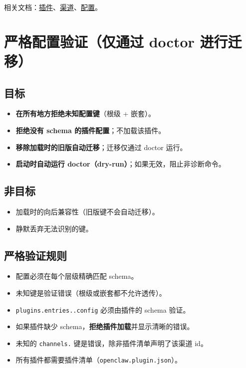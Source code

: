相关文档：\href{/tools/plugin}{插件}、\href{/channels/index}{渠道}、\href{/gateway/configuration}{配置}。


\clearpage

\section{严格配置验证（仅通过 doctor 进行迁移）}


\subsection{目标}


\begin{itemize}
  \item \textbf{在所有地方拒绝未知配置键}（根级 + 嵌套）。
  \item \textbf{拒绝没有 schema 的插件配置}；不加载该插件。
  \item \textbf{移除加载时的旧版自动迁移}；迁移仅通过 doctor 运行。
  \item \textbf{启动时自动运行 doctor（dry-run）}；如果无效，阻止非诊断命令。
\end{itemize}


\subsection{非目标}


\begin{itemize}
  \item 加载时的向后兼容性（旧版键不会自动迁移）。
  \item 静默丢弃无法识别的键。
\end{itemize}


\subsection{严格验证规则}


\begin{itemize}
  \item 配置必须在每个层级精确匹配 schema。
  \item 未知键是验证错误（根级或嵌套都不允许透传）。
  \item \texttt{plugins.entries..config} 必须由插件的 schema 验证。
  \item 如果插件缺少 schema，\textbf{拒绝插件加载}并显示清晰的错误。
  \item 未知的 \texttt{channels.} 键是错误，除非插件清单声明了该渠道 id。
  \item 所有插件都需要插件清单（\texttt{openclaw.plugin.json}）。
\end{itemize}


